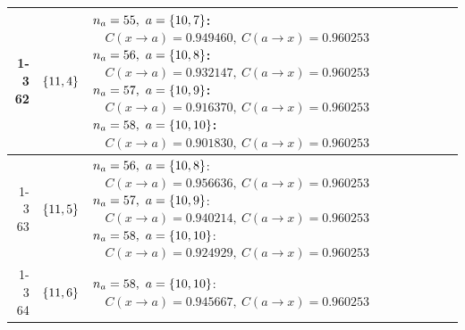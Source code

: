 \begin{longtable}{@{}r l >{\raggedright\arraybackslash}p{}@{}}
  \cmidrule(lr){1-3}
  62 & \(\left\{11,4\right\}\) & \(n_a=55,\ a=\sig{10,7}\):\newline \(\quad C(x\!\to\!a)=0.949460,\ C(a\!\to\!x)=0.960253\)\newline \(n_a=56,\ a=\sig{10,8}\):\newline \(\quad C(x\!\to\!a)=0.932147,\ C(a\!\to\!x)=0.960253\)\newline \(n_a=57,\ a=\sig{10,9}\):\newline \(\quad C(x\!\to\!a)=0.916370,\ C(a\!\to\!x)=0.960253\)\newline \(n_a=58,\ a=\sig{10,10}\):\newline \(\quad C(x\!\to\!a)=0.901830,\ C(a\!\to\!x)=0.960253\) \\
  \cmidrule(lr){1-3}
  63 & \(\left\{11,5\right\}\) & \(n_a=56,\ a=\sig{10,8}\):\newline \(\quad C(x\!\to\!a)=0.956636,\ C(a\!\to\!x)=0.960253\)\newline \(n_a=57,\ a=\sig{10,9}\):\newline \(\quad C(x\!\to\!a)=0.940214,\ C(a\!\to\!x)=0.960253\)\newline \(n_a=58,\ a=\sig{10,10}\):\newline \(\quad C(x\!\to\!a)=0.924929,\ C(a\!\to\!x)=0.960253\) \\
  \cmidrule(lr){1-3}
  64 & \(\left\{11,6\right\}\) & \(n_a=58,\ a=\sig{10,10}\):\newline \(\quad C(x\!\to\!a)=0.945667,\ C(a\!\to\!x)=0.960253\) \\
\end{longtable}
